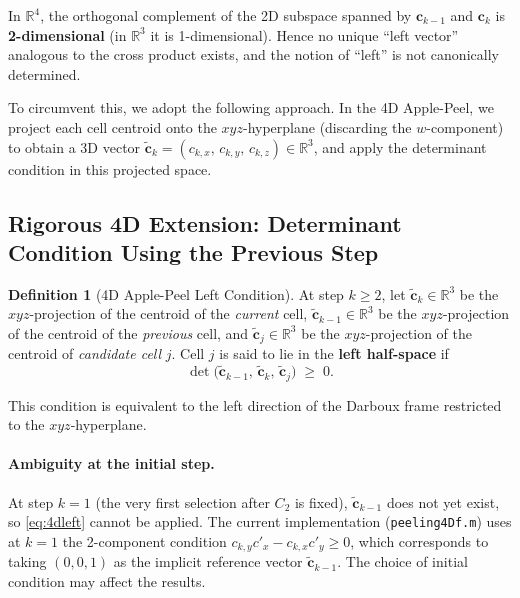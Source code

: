 \documentclass[12pt,a4paper]{article}
\theoremstyle{definition}
\newtheorem{defn}{Definition}[section]
\begin{document}
In $\mathbb{R}^4$, the orthogonal complement of the 2D subspace spanned by
$\mathbf{c}_{k-1}$ and $\mathbf{c}_k$ is \textbf{2-dimensional}
(in $\mathbb{R}^3$ it is 1-dimensional).
Hence no unique ``left vector'' analogous to the cross product exists,
and the notion of ``left'' is not canonically determined.

To circumvent this, we adopt the following approach.
In the 4D Apple-Peel, we project each cell centroid onto the
$xyz$-hyperplane (discarding the $w$-component) to obtain a 3D vector
$\tilde{\mathbf{c}}_k = (c_{k,x},\, c_{k,y},\, c_{k,z}) \in \mathbb{R}^3$,
and apply the determinant condition in this projected space.

\subsection{Rigorous 4D Extension: Determinant Condition Using the Previous Step}

\begin{defn}[4D Apple-Peel Left Condition]
  \label{defn:4dleft}
  At step $k \ge 2$, let
  $\tilde{\mathbf{c}}_k \in \mathbb{R}^3$ be the $xyz$-projection of the
  centroid of the \emph{current} cell,
  $\tilde{\mathbf{c}}_{k-1} \in \mathbb{R}^3$ be the $xyz$-projection of the
  centroid of the \emph{previous} cell, and
  $\tilde{\mathbf{c}}_j \in \mathbb{R}^3$ be the $xyz$-projection of the
  centroid of \emph{candidate cell} $j$.
  Cell $j$ is said to lie in the \textbf{left half-space} if
  \begin{equation}
    \det\!\bigl(\tilde{\mathbf{c}}_{k-1},\, \tilde{\mathbf{c}}_k,\, \tilde{\mathbf{c}}_j\bigr)
    \;\ge\; 0.
    \label{eq:4dleft}
  \end{equation}
\end{defn}

This condition is equivalent to the left direction of the Darboux frame
restricted to the $xyz$-hyperplane.

\paragraph{Ambiguity at the initial step.}
At step $k = 1$ (the very first selection after $C_2$ is fixed),
$\tilde{\mathbf{c}}_{k-1}$ does not yet exist, so \eqref{eq:4dleft} cannot
be applied.
The current implementation (\texttt{peeling4Df.m}) uses at $k = 1$ the
2-component condition
$c_{k,y} c'_x - c_{k,x} c'_y \ge 0$,
which corresponds to taking $(0,0,1)$ as the implicit reference vector
$\tilde{\mathbf{c}}_{k-1}$.
The choice of initial condition may affect the results.
\end{document}
